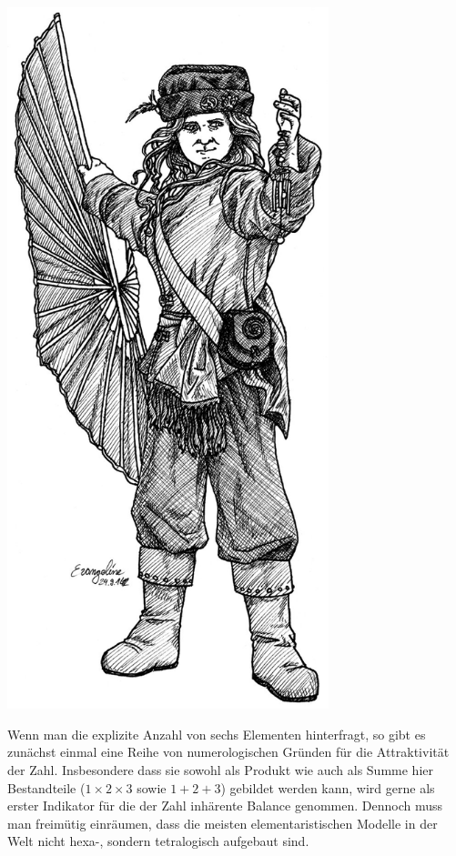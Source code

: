\documentclass[a5paper,8pt]{book}
\begin{document}
\begin{center}
\includegraphics[width=0.7\textwidth]{pictures/Maleska1.jpg}
\end{center}

Wenn man die explizite Anzahl von sechs Elementen hinterfragt, so gibt es zunächst einmal eine Reihe von numerologischen Gründen für die Attraktivität der Zahl. Insbesondere 
dass sie sowohl als Produkt wie auch als Summe hier Bestandteile ($1 \times 2  \times 3$ sowie $1 + 2 + 3$) gebildet werden kann, wird gerne als erster Indikator für die der Zahl inhärente 
Balance genommen. Dennoch muss man freimütig einräumen, dass die meisten elementaristischen Modelle in der Welt nicht hexa-, sondern tetralogisch aufgebaut sind.\\
\end{document}

